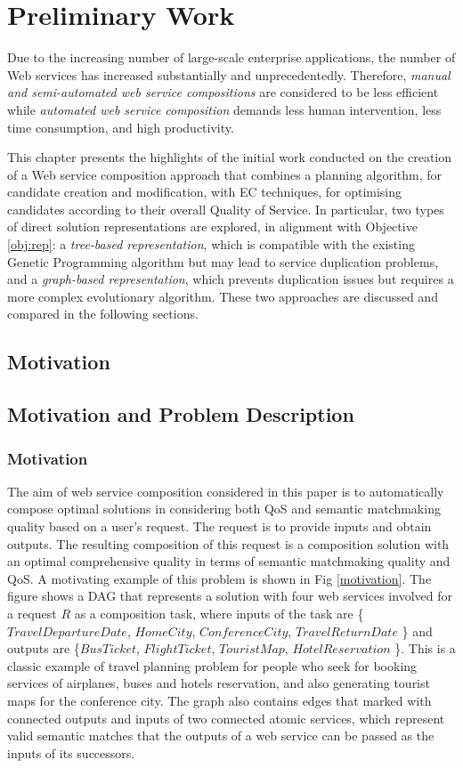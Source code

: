 \chapter{Preliminary Work}\label{C:preliminary}

Due to the increasing number of large-scale enterprise applications, the number of Web services has increased substantially and unprecedentedly. Therefore, \textit{manual and semi-automated web service compositions} are considered to be less efficient while \textit{automated web service composition} demands less human intervention, less time consumption, and high productivity.


This chapter presents the highlights of the initial work conducted on the creation of a Web service composition approach that combines a planning algorithm, for candidate creation and modification, with EC techniques, for optimising candidates according to their overall Quality of Service. In particular, two types of direct solution representations are explored, in alignment with Objective \ref{obj:rep}: a \textit{tree-based representation}, which is compatible with the existing Genetic Programming algorithm but may lead to service duplication problems, and a \textit{graph-based representation}, which prevents duplication issues but requires a more complex evolutionary algorithm. These two approaches are discussed and compared in the following sections.

\section{Motivation}
\section{Motivation and Problem Description}\label{Motivation and Problem Description}
\subsection{Motivation}\label{Motivation}

The aim of web service composition considered in this paper is to automatically compose optimal solutions in considering both QoS and semantic matchmaking quality based on a user's request. The request is to provide inputs and obtain outputs. The resulting composition of this request is a composition solution with an optimal comprehensive quality in terms of semantic matchmaking quality and QoS. A motivating example of this problem is shown in Fig \ref{motivation}. The figure shows a DAG that represents a solution with four web services involved for a request $R$ as a composition task, where inputs of the task are \{$TravelDepartureDate$, $HomeCity$, $ConferenceCity$, $TravelReturnDate$ \} and outputs are \{$BusTicket$, $FlightTicket$, $TouristMap$, $HotelReservation$ \}. This is a classic example of travel planning problem for people who seek for booking services of airplanes, buses and hotels reservation, and also generating tourist maps for the conference city. The graph also contains edges that marked with connected outputs and inputs of two connected atomic services, which represent valid semantic matches that the outputs of a web service can be passed as the inputs of its successors.

